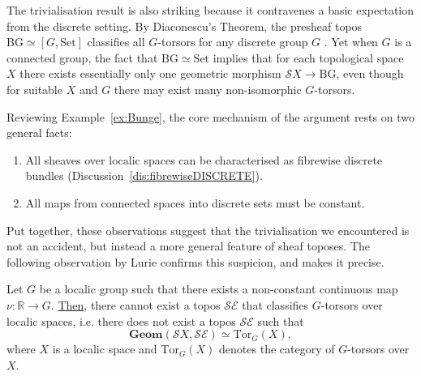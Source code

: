 \documentclass[a4paper, 11pt,reqno]{amsart}
\newcommand{\Tor}{\mathrm{Tor}}
\newcommand{\Set}{\mathrm{Set}}
\newcommand{\R}{\mathbb{R}}
\newcommand{\baseS}{\mathcal{S}}
\newcommand{\E}{\mathcal{E}}
\newcommand{\BG}{\mathrm{BG}}
\newcommand{\MING}[1]{{\color{blue} {\tiny \bf (M:)} {\bf #1}}}
\begin{document}
\begin{discussion}\label{dis:classifyDIStorsors} The trivialisation result is also striking because it contravenes a basic expectation from the discrete setting. By Diaconescu's Theorem, the presheaf topos $\BG\simeq [G,\Set]$ classifies all $G$-torsors for any discrete group $G$ \cite[B3.2]{Elephant}. Yet when $G$ is a connected group, the fact that  $\BG\simeq \Set$ implies that for each topological space $X$ there exists essentially only one geometric morphism $\baseS X\to \BG$, even though for suitable $X$ and $G$ there may exist many non-isomorphic $G$-torsors. %
\end{discussion}


Reviewing Example~\ref{ex:Bunge}, the core mechanism of the argument rests on two general facts:
\begin{enumerate}[label=(\alph*)]
	\item All sheaves over localic spaces can be characterised as fibrewise discrete bundles (Discussion~\ref{dis:fibrewiseDISCRETE}).
	\item All maps from connected spaces into discrete sets must be constant. 
\end{enumerate}
Put together, these observations suggest that the trivialisation we encountered is not an accident, but instead a more general feature of sheaf toposes. The following observation by Lurie confirms this suspicion, and makes it precise.



\begin{observation}\label{obs:Lurie} Let $G$ be a localic group such that there exists a non-constant continuous map $\nu\colon \R\to G$. \underline{Then}, there cannot exist a topos $\baseS\E$ that classifies $G$-torsors over localic spaces, i.e. there does not exist a topos $\baseS\E$ such that
	\[\textbf{Geom}(\baseS X,\baseS\E)\simeq \Tor_{G}(X),\] 
	where $X$ is a localic space and $\Tor_{G}(X)$ denotes the category of $G$-torsors over $X$. 	
\end{observation}
\end{document}
